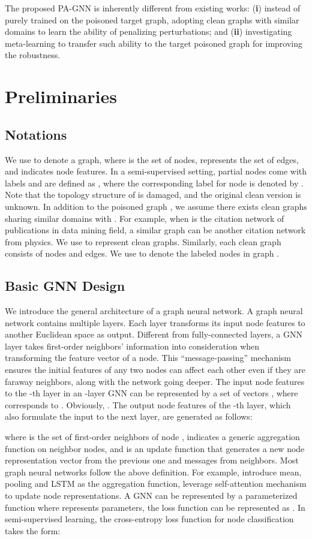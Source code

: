 \documentclass[sigconf]{acmart}
\newcommand{\ours}{{PA-GNN}\xspace}
\begin{document}
The proposed \ours is inherently different from existing works: (\textbf{i}) instead of purely trained on the poisoned target graph, adopting clean graphs with similar domains to learn the ability of penalizing perturbations; and (\textbf{ii}) investigating meta-learning to transfer such ability to the target poisoned graph for improving the robustness.  \section{Preliminaries}
\subsection{Notations}
We use  to denote a graph, where  is the set of  nodes,  represents the set of edges, and  indicates node features. In a semi-supervised setting, partial nodes come with labels and are defined as , where the corresponding label for node  is denoted by . Note that the topology structure of  is damaged, and the original clean version is unknown.
In addition to the poisoned graph , we assume there exists  clean graphs sharing similar domains with . For example, when  is the citation network of publications in data mining field, a similar graph can be another citation network from physics. We use  to represent clean graphs. Similarly, each clean graph consists of nodes and edges. We use  to denote the labeled nodes in graph .

\subsection{Basic GNN Design}
We introduce the general architecture of a graph neural network. A graph neural network contains multiple layers. Each layer transforms its input node features to another Euclidean space as output. Different from fully-connected layers, a GNN layer takes first-order neighbors' information into consideration when transforming the feature vector of a node. This ``message-passing'' mechanism ensures the initial features of any two nodes can affect each other even if they are faraway neighbors, along with the network going deeper.
The input node features to the -th layer in an -layer GNN can be represented by a set of vectors , where  corresponds to .
Obviously, .
The output node features of the -th layer, which also formulate the input to the next layer, are generated as follows:

where  is the set of first-order neighbors of node ,  indicates a generic aggregation function on neighbor nodes, and  is an update function that generates a new node representation vector from the previous one and messages from neighbors. Most graph neural networks follow the above definition. For example, \citeauthor{hamilton2017inductive} \cite{hamilton2017inductive} introduce mean, pooling and LSTM as the aggregation function, \citeauthor{velivckovic2017graph} \cite{velivckovic2017graph} leverage self-attention mechanism to update node representations.
A GNN can be represented by a parameterized function  where  represents parameters, the loss function can be represented as .
In semi-supervised learning, the cross-entropy loss function for node classification takes the form:
\end{document}
